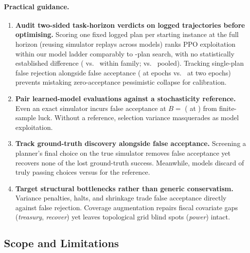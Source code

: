 \paragraph{Practical guidance.}\label{sec:whattodo}
\begin{enumerate}
\item \textbf{Audit two-sided task-horizon verdicts on logged trajectories before optimising.} Scoring one fixed logged plan per starting instance at the full horizon (reusing simulator replays across models) ranks PPO exploitation within our model ladder comparably to -plan search, with no statistically established difference (\AcEOneWithin{} vs.\ \AcWithin{} within family; \AcEOneRho{} vs.\ \AcRho{} pooled). Tracking single-plan false rejection alongside false acceptance (\ExtTrRandOneAllFalseRej{} at \ExtTrEpochs{} epochs vs.\ \ExtTrMainRandOneAllFalseRej{} at two epochs) prevents mistaking zero-acceptance pessimistic collapse for calibration.
\item \textbf{Pair learned-model evaluations against a stochasticity reference.} Even an exact simulator incurs \RandThouPerfHack{} false acceptance at $B ={}$ (\RandOnePerfHack{} at ) from finite-sample luck. Without a reference, selection variance masquerades as model exploitation.
\item \textbf{Track ground-truth discovery alongside false acceptance.} Screening a planner's final choice on the true simulator removes false acceptance yet recovers none of the \PaTenThouShort{} lost ground-truth success\RpWhatClause. Meanwhile, models discard \RandThouFalseRej{} of truly passing choices versus \RandThouPerfFalseRej{} for the reference.
\item \textbf{Target structural bottlenecks rather than generic conservatism.} Variance penalties, halts, and shrinkage trade false acceptance directly against false rejection. Coverage augmentation repairs fiscal covariate gaps (\emph{treasury}, \emph{recover}) yet leaves topological grid blind spots (\emph{power}) intact.
\end{enumerate}

\subsection*{Scope and Limitations}\label{sec:limits}

